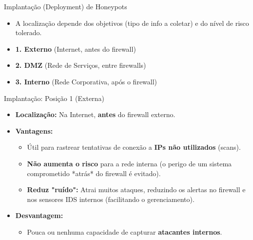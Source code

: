 \begin{frame}{Implantação (Deployment) de Honeypots}
    \begin{itemize}
        \item A localização depende dos objetivos (tipo de info a coletar) e do nível de risco tolerado.
    \end{itemize}



    \begin{itemize}
        \item \textbf{1. Externo} (Internet, antes do firewall)
        \item \textbf{2. DMZ} (Rede de Serviços, entre firewalls)
        \item \textbf{3. Interno} (Rede Corporativa, após o firewall)
    \end{itemize}
\end{frame}

\begin{frame}{Implantação: Posição 1 (Externa)}
    \begin{itemize}
        \item \textbf{Localização:} Na Internet, \textbf{antes} do firewall externo.

        \item \textbf{Vantagens:}
              \begin{itemize}
                  \item Útil para rastrear tentativas de conexão a \textbf{IPs não utilizados} (scans).
                  \item \textbf{Não aumenta o risco} para a rede interna (o perigo de um sistema comprometido *atrás* do firewall é evitado).
                  \item \textbf{Reduz "ruído":} Atrai muitos ataques, reduzindo os alertas no firewall e nos sensores IDS internos (facilitando o gerenciamento).
              \end{itemize}

        \item \textbf{Desvantagem:}
              \begin{itemize}
                  \item Pouca ou nenhuma capacidade de capturar \textbf{atacantes internos}.
              \end{itemize}
    \end{itemize}
\end{frame}

